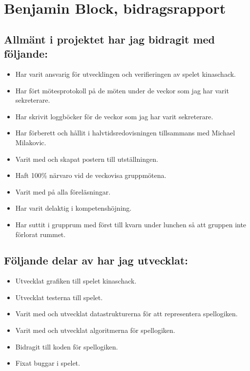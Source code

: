 
\section{Benjamin Block, bidragsrapport}
\subsection{Allmänt i projektet har jag bidragit med följande:}
\begin{itemize}
  \item Har varit ansvarig för utvecklingen och verifieringen av spelet kinaschack.
  \item Har fört mötesprotokoll på de möten under de veckor som jag har varit sekreterare.
  \item Har skrivit loggböcker för de veckor som jag har varit sekreterare.
  \item Har förberett och hållit i halvtidsredovisningen tillsammans med Michael Milakovic.
  \item Varit med och skapat postern till utställningen.
  \item Haft 100\% närvaro vid de veckovisa gruppmötena.
  \item Varit med på alla föreläsningar.
  \item Har varit delaktig i kompetenshöjning.
  \item Har suttit i grupprum med först till kvarn under lunchen så att gruppen inte förlorat rummet.
\end{itemize}

\subsection{Följande delar av har jag utvecklat:}
\begin{itemize}
  \item Utvecklat grafiken till spelet kinaschack.
  \item Utvecklat testerna till spelet.
  \item Varit med och utvecklat datastrukturerna för att representera spellogiken.
  \item Varit med och utvecklat algoritmerna för spellogiken.
  \item Bidragit till koden för spellogiken.
  \item Fixat buggar i spelet.
\end{itemize}


